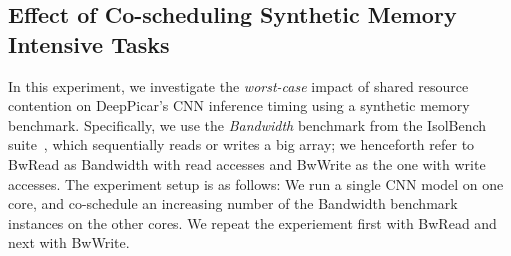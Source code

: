 
\subsection{Effect of Co-scheduling Synthetic Memory Intensive
  Tasks}\label{sec:eval-memhog}

In this experiment, we investigate the \emph{worst-case} impact of shared
resource contention on DeepPicar's CNN inference timing using
a synthetic memory benchmark. Specifically, we use the \emph{Bandwidth}
benchmark from the IsolBench suite~\cite{Valsan2016}, which
sequentially reads or writes a big array; we henceforth refer to BwRead
as Bandwidth with read accesses and BwWrite as the one with write
accesses. The experiment setup is as follows: We run a single CNN
model on one core, and co-schedule an increasing number of the
Bandwidth benchmark instances on the other cores. We repeat the
experiement first with BwRead and next with BwWrite.


